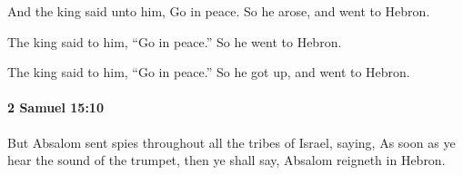 			\begin{versebox}
					\item[BHS] 
					\item[ASV] And the king said unto him, Go in peace. So he arose, and went to Hebron.
					\item[NIV] The king said to him, “Go in peace.” So he went to Hebron.
					\item[NRSV] The king said to him, “Go in peace.” So he got up, and went to Hebron.
			\end{versebox}

		\paragraph{2 Samuel 15:10} %
			\label{2SAMUEL-15-10}

			But Absalom sent spies throughout all the tribes of Israel, saying, As soon as ye hear the sound of the trumpet, then ye shall say, Absalom reigneth in Hebron.

